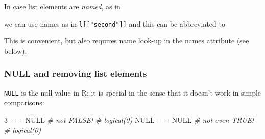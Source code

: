 \documentclass[]{book}
\newenvironment{Shaded}{\begin{snugshade}}{\end{snugshade}}
\newcommand{\CommentTok}[1]{\textcolor[rgb]{0.56,0.35,0.01}{\textit{#1}}}
\newcommand{\DataTypeTok}[1]{\textcolor[rgb]{0.13,0.29,0.53}{#1}}
\newcommand{\DecValTok}[1]{\textcolor[rgb]{0.00,0.00,0.81}{#1}}
\newcommand{\KeywordTok}[1]{\textcolor[rgb]{0.13,0.29,0.53}{\textbf{#1}}}
\newcommand{\NormalTok}[1]{#1}
\newcommand{\OperatorTok}[1]{\textcolor[rgb]{0.81,0.36,0.00}{\textbf{#1}}}
\newcommand{\OtherTok}[1]{\textcolor[rgb]{0.56,0.35,0.01}{#1}}
\newcommand{\StringTok}[1]{\textcolor[rgb]{0.31,0.60,0.02}{#1}}
\begin{document}
In case list elements are \emph{named}, as in

\begin{Shaded}
\end{Shaded}

we can use names as in \texttt{l{[}{[}"second"{]}{]}} and this can be
abbreviated to

\begin{Shaded}
\end{Shaded}

This is convenient, but also requires name look-up in the names
attribute (see below).

\hypertarget{null-and-removing-list-elements}{%
\subsubsection*{NULL and removing list elements}\label{null-and-removing-list-elements}}

\texttt{NULL} is the null value in R; it is special in the sense that it doesn't work
in simple comparisons:

\begin{Shaded}
\begin{Highlighting}[]
\DecValTok{3} \OperatorTok{==}\StringTok{ }\OtherTok{NULL} \CommentTok{# not FALSE!}
\CommentTok{# logical(0)}
\OtherTok{NULL} \OperatorTok{==}\StringTok{ }\OtherTok{NULL} \CommentTok{# not even TRUE!}
\CommentTok{# logical(0)}
\end{Highlighting}
\end{Shaded}
\end{document}
